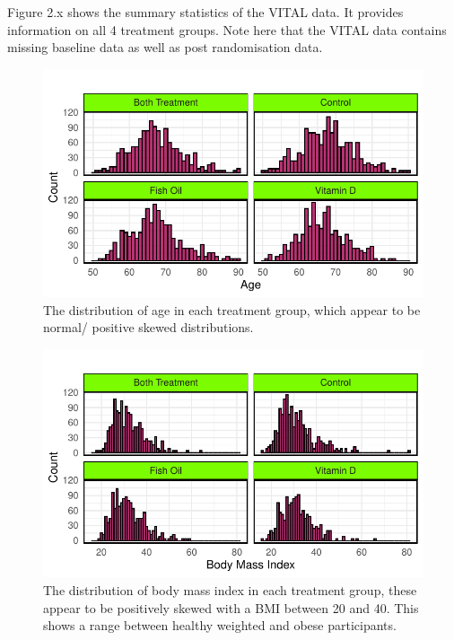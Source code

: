 \documentclass{article}
\begin{document}
Figure 2.x shows the summary statistics of the VITAL data. It provides
information on all 4 treatment groups. Note here that the VITAL data
contains missing baseline data as well as post randomisation data.

\begin{figure}

{\centering \includegraphics{Final_Report_files/figure-latex/unnamed-chunk-14-1} 

}

\caption{The distribution of age in each treatment group, which appear to be normal/ positive skewed distributions.}\label{fig:unnamed-chunk-14}
\end{figure}

\begin{figure}

{\centering \includegraphics{Final_Report_files/figure-latex/unnamed-chunk-15-1} 

}

\caption{The distribution of body mass index in each treatment group, these appear to be positively skewed with a BMI between 20 and 40. This shows a range between healthy weighted and obese participants.}\label{fig:unnamed-chunk-15}
\end{figure}
\end{document}

